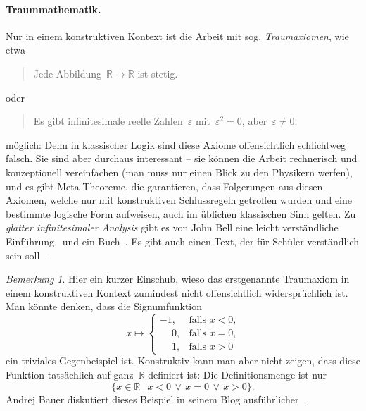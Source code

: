 \documentclass[a4paper,ngerman,12pt]{scrartcl}
\theoremstyle{definition}
\theoremstyle{plain}
\theoremstyle{remark}
\newtheorem{bem}[defn]{Bemerkung}
\newcommand{\RR}{\mathbb{R}}
\renewcommand{\_}{\mathpunct{.}\,}
\newcommand{\?}{\,{:}\,}
\begin{document}
\paragraph{Traummathematik.} Nur in einem konstruktiven Kontext ist die Arbeit
mit sog. \emph{Traum\-axio\-men}, wie etwa
\begin{quote}Jede Abbildung~$\RR \to \RR$ ist stetig.\end{quote}
oder
\begin{quote}Es gibt infinitesimale reelle Zahlen~$\varepsilon$
mit~$\varepsilon^2 = 0$, aber~$\varepsilon \neq 0$.\end{quote}
möglich: Denn in klassischer Logik sind diese Axiome offensichtlich schlichtweg
falsch. Sie sind aber durchaus interessant -- sie können die Arbeit
rechnerisch und konzeptionell vereinfachen (man muss nur einen Blick zu den
Physikern werfen), und es gibt Meta-Theoreme, die garantieren, dass Folgerungen
aus diesen Axiomen, welche nur mit konstruktiven Schlussregeln getroffen wurden
und eine bestimmte logische Form aufweisen, auch im üblichen klassischen Sinn
gelten. Zu \emph{glatter infinitesimaler Analysis} gibt es von John Bell eine
leicht verständliche Einführung~\cite{bell:invitation} und ein
Buch~\cite{bell:primer}. Es gibt auch einen Text, der für Schüler verständlich
sein soll~\cite{mathezirkel:sdg}.

\begin{bem}Hier ein kurzer Einschub, wieso das erstgenannte Traumaxiom
in einem konstruktiven Kontext zumindest nicht offensichtlich widersprüchlich
ist. Man könnte denken, dass die Signumfunktion
\[ x \longmapsto \begin{cases}
  -1, & \text{falls $x < 0$,} \\
  \phantom{+}0, & \text{falls $x = 0$,} \\
  \phantom{+}1, & \text{falls $x > 0$}
\end{cases} \]
ein triviales Gegenbeispiel ist. Konstruktiv kann man aber nicht zeigen, dass
diese Funktion tatsächlich auf ganz~$\RR$ definiert ist: Die Definitionsmenge
ist nur
\[ \{ x \in \RR \ |\  x < 0 \,\vee\, x = 0 \,\vee\, x > 0 \}. \]
Andrej Bauer diskutiert dieses Beispiel in seinem Blog
ausführlicher~\cite{bauer:blog:stetigkeit}.
\end{bem}
\end{document}
